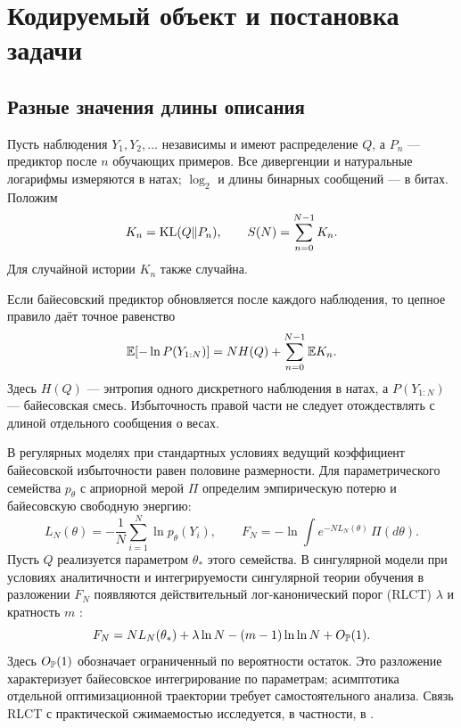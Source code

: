 \section{Кодируемый объект и постановка задачи}
\label{sec:setup}

\subsection{Разные значения длины описания}

Пусть наблюдения $Y_1,Y_2,\dots$ независимы и имеют распределение $Q$,
а $P_n$ --- предиктор после $n$ обучающих примеров.
Все дивергенции и натуральные логарифмы измеряются в натах;
$\log_2$ и длины бинарных сообщений --- в битах. Положим
\[
 K_n=\operatorname{KL}(Q\Vert P_n),\qquad S(N)=\sum_{n=0}^{N-1}K_n.
\]
Для случайной истории $K_n$ также случайна.

Если байесовский предиктор обновляется после каждого наблюдения, то цепное
правило даёт точное равенство
\begin{equation}
 \mathbb E[-\ln P(Y_{1:N})]=NH(Q)+\sum_{n=0}^{N-1}\mathbb E K_n.
 \label{eq:prequential}
\end{equation}
Здесь $H(Q)$ --- энтропия одного дискретного наблюдения в натах, а
$P(Y_{1:N})$ --- байесовская смесь. Избыточность правой части не следует
отождествлять с длиной отдельного сообщения о весах.

В регулярных моделях при стандартных условиях ведущий коэффициент байесовской
избыточности равен половине размерности. Для параметрического семейства
$p_\theta$ с априорной мерой $\Pi$ определим эмпирическую потерю и байесовскую
свободную энергию:
\[
 L_N(\theta)=-\frac1N\sum_{i=1}^{N}\ln p_\theta(Y_i),\qquad
 F_N=-\ln\int e^{-NL_N(\theta)}\,\Pi(d\theta).
\]
Пусть $Q$ реализуется параметром $\theta_*$ этого семейства. В сингулярной
модели при условиях аналитичности и интегрируемости сингулярной теории обучения
в разложении $F_N$ появляются действительный лог-канонический порог (RLCT)
$\lambda$ и кратность $m$ \citep{watanabe2009,watanabe2013}:
\begin{equation}
 F_N=NL_N(\theta_*)
       +\lambda\ln N-(m-1)\ln\ln N+O_{\mathbb P}(1).
 \label{eq:slt}
\end{equation}
Здесь $O_{\mathbb P}(1)$ обозначает ограниченный по вероятности остаток.
Это разложение характеризует байесовское интегрирование по параметрам;
асимптотика отдельной оптимизационной траектории требует самостоятельного
анализа. Связь RLCT с практической сжимаемостью исследуется, в частности,
в \citet{urdshals2025}.

